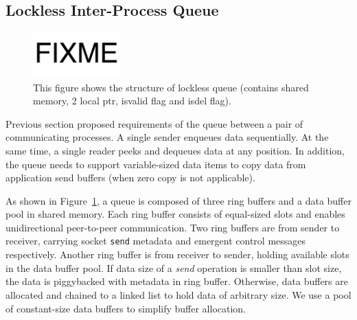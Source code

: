 


\subsection{Lockless Inter-Process Queue}
\label{subsec:lockless-queue}

\begin{figure}[t]
	\centering
	\includegraphics[width=0.3\textwidth]{images/fixme}
	\caption{This figure shows the structure of lockless queue (contains shared memory, 2 local ptr, isvalid flag and isdel flag).}
	\label{fig:locklessq-structure}
\end{figure}

Previous section proposed requirements of the queue between a pair of communicating processes. A single sender enqueues data sequentially. At the same time, a single reader peeks and dequeues data at any position. In addition, the queue needs to support variable-sized data items to copy data from application send buffers (when zero copy is not applicable).

As shown in Figure~\ref{fig:locklessq-structure}, a queue is composed of three ring buffers and a data buffer pool in shared memory. Each ring buffer consists of equal-sized slots and enables unidirectional peer-to-peer communication. Two ring buffers are from sender to receiver, carrying socket \texttt{send} metadata and emergent control messages respectively. Another ring buffer is from receiver to sender, holding available slots in the data buffer pool. If data size of a \textit{send} operation is smaller than slot size, the data is piggybacked with metadata in ring buffer. Otherwise, data buffers are allocated and chained to a linked list to hold data of arbitrary size. We use a pool of constant-size data buffers to simplify buffer allocation.

